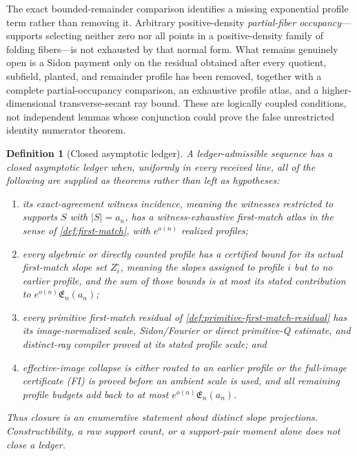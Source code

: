 \documentclass[12pt,a4paper]{amsart}
\numberwithin{equation}{section}
\newtheorem{definition}[definition]{Definition}
\theoremstyle{remark}
\newcommand{\abs}[1]{\lvert #1\rvert}
\begin{document}
The exact bounded-remainder comparison identifies a missing exponential
profile term rather than removing it.  Arbitrary positive-density
\emph{partial-fiber occupancy}---supports selecting neither zero nor all
points in a positive-density family of folding fibers---is not exhausted
by that normal form.  What
remains genuinely open is a Sidon payment only on the residual obtained
after every quotient, subfield, planted, and remainder profile has been
removed, together with a complete partial-occupancy comparison, an
exhaustive profile atlas, and a higher-dimensional transverse-secant ray
bound.  These are logically coupled conditions, not independent lemmas
whose conjunction could prove the false unrestricted identity
numerator theorem.

\begin{definition}[Closed asymptotic ledger]\label{def:closed-asymptotic-ledger}
A ledger-admissible sequence has a \emph{closed asymptotic ledger} when,
uniformly in every received line, all of the following are supplied as
theorems rather than left as hypotheses:
\begin{enumerate}[label=\textup{(L\arabic*)},leftmargin=*]
\item its \emph{exact-agreement witness incidence}, meaning the witnesses
      restricted to supports \(S\) with \(\abs S=a_n\), has a witness-exhaustive
      first-match atlas in the sense of \cref{def:first-match}, with
      \(e^{o(n)}\) realized profiles;
\item every algebraic or directly counted profile has a certified bound
      for its actual first-match slope set \(Z_i^\circ\), meaning the
      slopes assigned to profile \(i\) but to no earlier profile, and the sum of
      those bounds is at most its stated contribution to
      \(e^{o(n)}\mathfrak E_n(a_n)\);
\item every primitive first-match residual of
      \cref{def:primitive-first-match-residual} has its image-normalized
      scale, Sidon/Fourier or direct primitive-Q estimate, and distinct-ray
      compiler proved at its stated profile scale; and
\item effective-image collapse is either routed to an earlier profile or
      the full-image certificate \textup{(FI)} is proved before an ambient
      scale is used, and all remaining profile budgets add back to at most
      \(e^{o(n)}\mathfrak E_n(a_n)\).
\end{enumerate}
Thus closure is an enumerative statement about distinct slope projections.
Constructibility, a raw support count, or a support-pair moment alone does
not close a ledger.
\end{definition}
\end{document}

